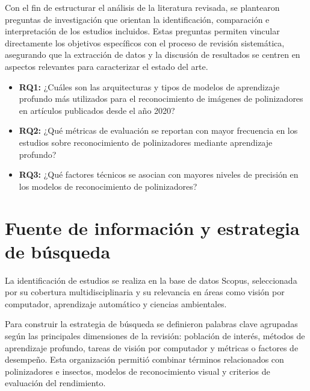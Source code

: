 Con el fin de estructurar el análisis de la literatura revisada, se plantearon preguntas de investigación que orientan la identificación, comparación e interpretación de los estudios incluidos. Estas preguntas permiten vincular directamente los objetivos específicos con el proceso de revisión sistemática, asegurando que la extracción de datos y la discusión de resultados se centren en aspectos relevantes para caracterizar el estado del arte.

\begin{itemize}
    \item \textbf{RQ1:} ¿Cuáles son las arquitecturas y tipos de modelos de aprendizaje profundo más utilizados para el reconocimiento de imágenes de polinizadores en artículos publicados desde el año 2020?
    
    \item \textbf{RQ2:} ¿Qué métricas de evaluación se reportan con mayor frecuencia en los estudios sobre reconocimiento de polinizadores mediante aprendizaje profundo?
    
    \item \textbf{RQ3:} ¿Qué factores técnicos se asocian con mayores niveles de precisión en los modelos de reconocimiento de polinizadores?
\end{itemize}

\section{Fuente de información y estrategia de búsqueda}

La identificación de estudios se realiza en la base de datos Scopus, seleccionada por su cobertura multidisciplinaria y su relevancia en áreas como visión por computador, aprendizaje automático y ciencias ambientales. 

Para construir la estrategia de búsqueda se definieron palabras clave agrupadas según las principales dimensiones de la revisión: población de interés, métodos de aprendizaje profundo, tareas de visión por computador y métricas o factores de desempeño. Esta organización permitió combinar términos relacionados con polinizadores e insectos, modelos de reconocimiento visual y criterios de evaluación del rendimiento. \\

\begingroup

\setlength{\tabcolsep}{4pt}
\renewcommand{\arraystretch}{1.08}
\small

